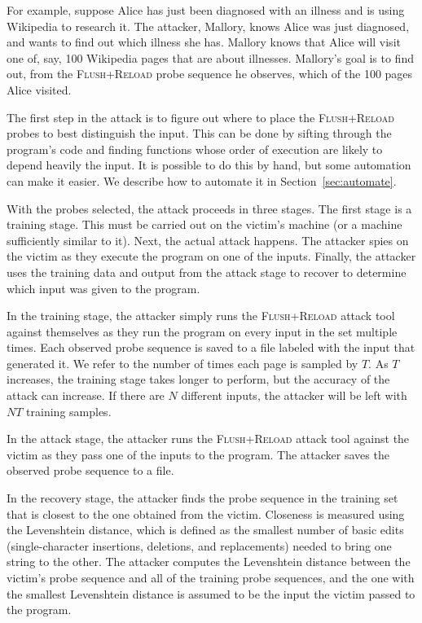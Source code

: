 \documentclass[letterpaper,twocolumn,10pt]{article}
\begin{document}
For example, suppose Alice has just been diagnosed with an illness and is using
Wikipedia to research it. The attacker, Mallory, knows Alice was just diagnosed,
and wants to find out which illness she has. Mallory knows that Alice will visit
one of, say, 100 Wikipedia pages that are about illnesses. Mallory's goal is to
find out, from the \textsc{Flush+Reload} probe sequence he observes, which of
the 100 pages Alice visited.

The first step in the attack is to figure out where to place the
\textsc{Flush+Reload} probes to best distinguish the input. This can be done by
sifting through the program's code and finding functions whose order of
execution are likely to depend heavily the input. It is possible to do this by
hand, but some automation can make it easier. We describe how to automate it in
Section~\ref{sec:automate}.

With the probes selected, the attack proceeds in three stages. The first stage
is a training stage. This must be carried out on the victim's machine (or
a machine sufficiently similar to it). Next, the actual attack happens. The
attacker spies on the victim as they execute the program on one of the inputs.
Finally, the attacker uses the training data and output from the attack stage to
recover to determine which input was given to the program.

In the training stage, the attacker simply runs the \textsc{Flush+Reload} attack
tool against themselves as they run the program on every input in the set
multiple times. Each observed probe sequence is saved to a file labeled with the
input that generated it. We refer to the number of times each page is sampled by
$T$. As $T$ increases, the training stage takes longer to perform, but the
accuracy of the attack can increase. If there are $N$ different inputs, the
attacker will be left with $NT$ training samples.

In the attack stage, the attacker runs the \textsc{Flush+Reload} attack tool
against the victim as they pass one of the inputs to the program. The attacker
saves the observed probe sequence to a file.

In the recovery stage, the attacker finds the probe sequence in the training set
that is closest to the one obtained from the victim. Closeness is measured using
the Levenshtein distance\cite{levenshtein1966binary}, which is defined as the
smallest number of basic edits (single-character insertions, deletions, and
replacements) needed to bring one string to the other. The attacker computes the
Levenshtein distance between the victim's probe sequence and all of the training
probe sequences, and the one with the smallest Levenshtein distance is assumed
to be the input the victim passed to the program.
\end{document}
